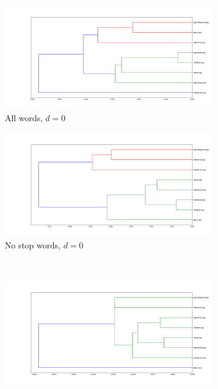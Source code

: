 \documentclass[fleqn]{article}
\begin{document}
\begin{figure}
	\begin{subfigure}[t]{0.475\textwidth}
    	\includegraphics[width=\textwidth]{figures/all_words/dendrogram_d0.png}
    	\caption{All words, $d = 0$}
        \label{fig:all:d0}
    \end{subfigure}\hfill
	\begin{subfigure}[t]{0.475\textwidth}
        \includegraphics[width=\textwidth]{figures/stopwords_excluded/dendrogram_d0.png}
    	\caption{No stop words, $d = 0$}
        \label{fig:sw:d0}
    \end{subfigure}\hfill
    \\
	\begin{subfigure}[t]{0.475\textwidth}
    	\includegraphics[width=\textwidth]{figures/all_words/dendrogram_d1.png}

\end{subfigure}
\end{figure}
\end{document}

